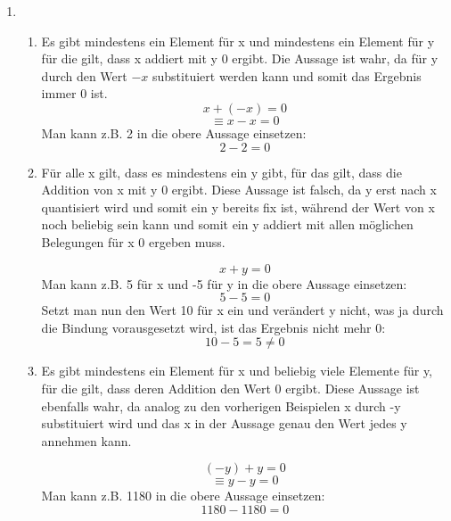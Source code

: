 \documentclass[a4paper]{article}
\begin{document}
	\begin{enumerate}
		\item
		\begin{enumerate}
			\item
			Es gibt mindestens ein Element für x und mindestens ein Element für y für die gilt, dass x addiert mit y 0 ergibt.
			\newline
			Die Aussage ist wahr, da für y durch den Wert $-x$ substituiert werden kann und somit das Ergebnis immer 0 ist.
			\begin{equation*}
				x + (-x) = 0
			\end{equation*}
			\begin{equation*}
				\equiv x - x = 0
			\end{equation*}
			Man kann z.B. 2 in die obere Aussage einsetzen:
			\begin{equation*}
				2 - 2 = 0
			\end{equation*}
			
			\item
			Für alle x gilt, dass es mindestens ein y gibt, für das gilt, dass die Addition von x mit y 0 ergibt.
			\newline
			Diese Aussage ist falsch, da y erst nach x quantisiert wird und somit ein y bereits fix ist, während der Wert von x noch beliebig sein kann und somit ein y addiert mit allen möglichen Belegungen für x 0 ergeben muss.
			
			\begin{equation*}
				x + y = 0
			\end{equation*}
			Man kann z.B. 5 für x und -5 für y in die obere Aussage einsetzen:
			\begin{equation*}
				5 - 5 = 0
			\end{equation*}
			Setzt man nun den Wert 10 für x ein und verändert y nicht, was ja durch die Bindung vorausgesetzt wird, ist das Ergebnis nicht mehr 0:
			\begin{equation*}
				10 - 5 = 5 \neq 0
			\end{equation*}
			
			\item
			Es gibt mindestens ein Element für x und beliebig viele Elemente für y, für die gilt, dass deren Addition den Wert 0 ergibt.
			\newline
			Diese Aussage ist ebenfalls wahr, da analog zu den vorherigen Beispielen x durch -y substituiert wird und das x in der Aussage genau den Wert jedes y annehmen kann.
			
			\begin{equation*}
				(-y) + y = 0
			\end{equation*}
			\begin{equation*}
				\equiv y - y = 0
			\end{equation*}
			Man kann z.B. 1180 in die obere Aussage einsetzen:
			\begin{equation*}
				1180 - 1180 = 0
			\end{equation*}
			

\end{enumerate}
\end{enumerate}
\end{document}
